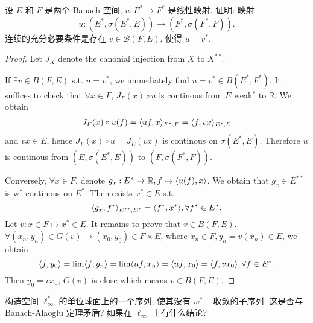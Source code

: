 \begin{exercise}[7]
    设 $E$ 和 $F$ 是两个 Banach 空间, $u: E^{*} \rightarrow F^{*}$ 是线性映射. 证明: 映射
    \[
    u:(E^{*},\sigma(E^{*}, E)) \rightarrow(F^{*}, \sigma(F^{*}, F)).
    \]
    连续的充分必要条件是存在 $v\in\mathcal{B}(F, E)$, 使得 $u=v^{*}$. 
\end{exercise}

\begin{proof}
    Let $J_X$ denote the canonial injection from $X$ to $X^{**}$. 
    
    If $\exists v\in B(F, E)$ s.t. $u = v^*$, we immediately find $u = v^*\in B(E^*, F^*)$. It suffices to check that $\forall x\in F$, $J_F(x)\circ u$ is continous from $E$ weak$^*$ to $\mathbb R$. We obtain  
    \[ \begin{aligned}
        J_F(x)\circ u(f) = \langle uf,x\rangle_{F^*, F}=\langle f,vx\rangle_{E^*, E}
    \end{aligned} \]
    and $vx\in E$, hence $J_F(x)\circ u = J_E(vx)$ is continous on $\sigma(E^*, E)$. Therefore $u$ is continous from $(E, \sigma(E^*, E))$ to $(F, \sigma(F^*, F))$. 

    Conversely, $\forall x \in F$, denote $g_x: E^*\to \mathbb R, f\mapsto \langle u(f),x\rangle$. We obtain that $g_x\in E^{**}$ is w$^*$ continous on $E^*$. Then exists $x^*\in E$ s.t. 
    \[\langle g_x,f^*\rangle_{E^{**}, E^*} = \langle f^*,x^*\rangle, \forall f^*\in E^*. \]
    Let $v: x\in F\mapsto x^*\in E$. 
    It remains to prove that $v\in B(F, E)$. $\forall (x_n, y_n)\in G(v)\to (x_0, y_0)\in F\times E$, where $x_n\in F, y_n = v(x_n)\in E$, we obtain
    \[ \langle f,y_0\rangle = \lim\langle f,y_n\rangle = \lim\langle uf,x_n\rangle = \langle uf,x_0\rangle = \langle f,vx_0\rangle, \forall f\in E^*. \]
    Then $y_0 = vx_0$, $G(v)$ is close which means $v\in B(F, E)$.
\end{proof}



\begin{exercise}[9]
    构造空间 $\ell_{\infty}^{*}$ 的单位球面上的一个序列, 使其没有 $w^{*}-$收敛的子序列. 
    这是否与 Banach-Alaoglu 定理矛盾? 如果在 $\ell_{\infty}$ 上有什么结论?
\end{exercise}

